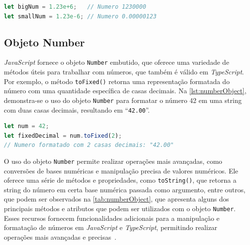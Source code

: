 \begin{lstlisting}[language=TypeScript, caption={Notação científica em \textit{JavaScript} e \textit{TypeScript}}, label={lst:scientific}]
let bigNum = 1.23e+6;   // Numero 1230000
let smallNum = 1.23e-6; // Numero 0.00000123
\end{lstlisting}

\subsection{Objeto Number} 

\textit{JavaScript} fornece o objeto \texttt{Number} embutido, que oferece uma variedade de métodos úteis para trabalhar com números, que também é válido em \textit{TypeScript}. Por exemplo, o método \texttt{toFixed()} retorna uma representação formatada do número com uma quantidade específica de casas decimais. Na \autoref{lst:numberObject}, demonstra-se o uso do objeto \texttt{Number} para formatar o número 42 em uma string com duas casas decimais, resultando em ``\texttt{42.00}''.

\begin{lstlisting}[language=TypeScript, caption={Utilizando o objeto Number em \textit{JavaScript} e \textit{TypeScript}}, label={lst:numberObject}]
let num = 42;
let fixedDecimal = num.toFixed(2); 
// Numero formatado com 2 casas decimais: "42.00"
\end{lstlisting}

O uso do objeto \texttt{Number} permite realizar operações mais avançadas, como conversões de bases numéricas e manipulação precisa de valores numéricos. Ele oferece uma série de métodos e propriedades, como \texttt{toString()}, que retorna a string do número em certa base numérica passada como argumento, entre outros, que podem ser observados na \autoref{tab:numberObject}, que apresenta alguns dos principais métodos e atributos que podem ser utilizados com o objeto \texttt{Number}. Esses recursos fornecem funcionalidades adicionais para a manipulação e formatação de números em \textit{JavaScript} e \textit{TypeScript}, permitindo realizar operações mais avançadas e precisas~\cite{mdn_numbers_dates}.


